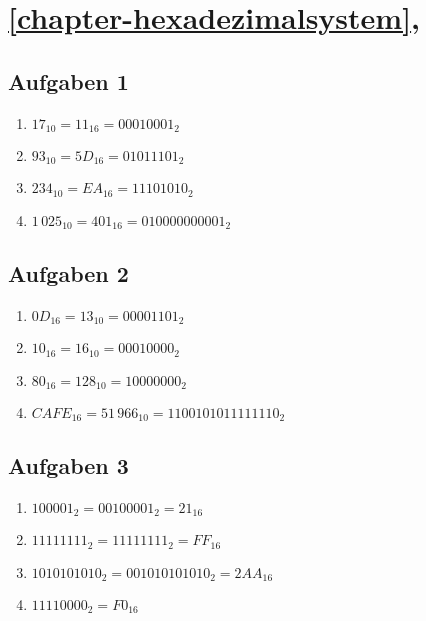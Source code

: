 \section{\autoref{chapter-hexadezimalsystem}, }

\subsection*{Aufgaben 1}

\begin{enumerate}
\item $17_{10} = 11_{16} = 00010001_2$
\item $93_{10} = 5D_{16} = 01011101_2$
\item $234_{10} = EA_{16} = 11101010_2$
\item $1\,025_{10} = 401_{16} = 010000000001_2$
\end{enumerate}

\subsection*{Aufgaben 2}

\begin{enumerate}
\item $0D_{16} = 13_{10} = 00001101_2$
\item $10_{16} = 16_{10} = 00010000_2$
\item $80_{16} = 128_{10} = 10000000_2$
\item $CAFE_{16} = 51\,966_{10} = 1100101011111110_2$
\end{enumerate}

\subsection*{Aufgaben 3}

\begin{enumerate}
\item $100001_2  = 00100001_2 = 21_{16}$
\item $11111111_2 = 11111111_2 = FF_{16}$
\item $1010101010_2 = 001010101010_2 = 2AA_{16}$
\item $11110000_2 = F0_{16}$
\end{enumerate}